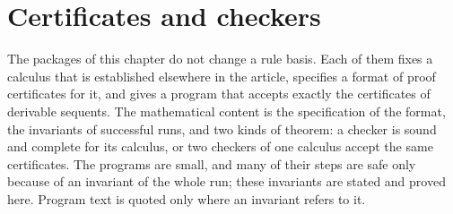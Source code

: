 \chapter{Certificates and checkers}\label{cert:chapter}
\label{prov:ch:cert}

The packages of this chapter do not change a rule basis. Each of them fixes a
calculus that is established elsewhere in the article, specifies a format of
proof certificates for it, and gives a program that accepts exactly the
certificates of derivable sequents. The mathematical content is the
specification of the format, the invariants of successful runs, and two kinds
of theorem: a checker is sound and complete for its calculus, or two checkers
of one calculus accept the same certificates. The programs are small, and many
of their steps are safe only because of an invariant of the whole run; these
invariants are stated and proved here. Program text is quoted only where an
invariant refers to it.

